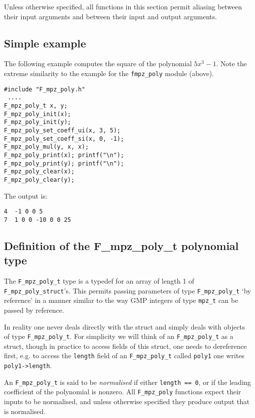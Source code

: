 \documentclass[a4paper,10pt]{article}
\newcommand{\code}{\lstinline}
\begin{document}
Unless otherwise specified, all functions in this section permit aliasing between their input arguments 
and between their input and output arguments. 

\subsection{Simple example}

The following example computes the square of the polynomial $5x^3 - 1$. Note the extreme similarity to
the example for the \code{fmpz_poly} module (above).

\begin{lstlisting}
#include "F_mpz_poly.h"
 ....
F_mpz_poly_t x, y;
F_mpz_poly_init(x);
F_mpz_poly_init(y);
F_mpz_poly_set_coeff_ui(x, 3, 5);
F_mpz_poly_set_coeff_si(x, 0, -1);
F_mpz_poly_mul(y, x, x);
F_mpz_poly_print(x); printf("\n");
F_mpz_poly_print(y); printf("\n");
F_mpz_poly_clear(x);
F_mpz_poly_clear(y);
\end{lstlisting}

The output is:

\begin{lstlisting}
4  -1 0 0 5
7  1 0 0 -10 0 0 25
\end{lstlisting}

\subsection{Definition of the F\_mpz\_poly\_t polynomial type}

The \code{F_mpz_poly_t} type is a typedef for an array of length 1 of \code{F_mpz_poly_struct}'s. This 
permits passing parameters of type \code{F_mpz_poly_t} `by reference' in a manner similar to the way 
GMP integers of type \code{mpz_t} can be passed by reference. 

In reality one never deals directly with the struct and simply deals with objects of type 
\code{F_mpz_poly_t}. For simplicity we will think of an \code{F_mpz_poly_t} as a struct, though in
 practice to access fields of this struct, one needs to dereference first, e.g. to access the 
\code{length} field of an \code{F_mpz_poly_t} called \code{poly1} one writes \code{poly1->length}. 

An \code{F_mpz_poly_t} is said to be \emph{normalised} if either \code{length == 0}, or if the 
leading coefficient of the polynomial is nonzero. All \code{F_mpz_poly} functions expect their inputs 
to be normalised, and unless otherwise specified they produce output that is normalised. 
\end{document}
